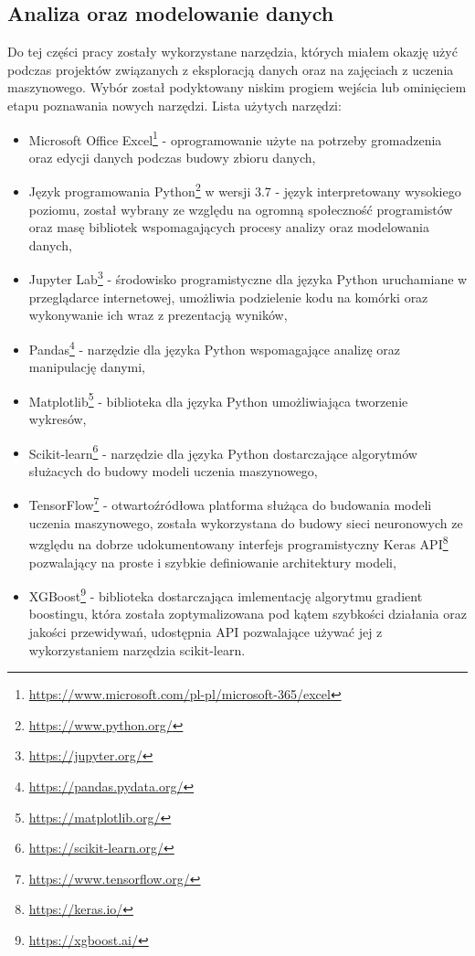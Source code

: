\subsection{Analiza oraz modelowanie danych}\label{sec:tools-data-analysis-modeling}
Do tej części pracy zostały wykorzystane narzędzia, których miałem okazję użyć podczas projektów związanych z eksploracją danych oraz na zajęciach z uczenia maszynowego. Wybór został podyktowany niskim progiem wejścia lub ominięciem etapu poznawania nowych narzędzi.
\newpage
Lista użytych narzędzi:
\begin{itemize}
    \item Microsoft Office Excel\footnote{\url{https://www.microsoft.com/pl-pl/microsoft-365/excel}} - oprogramowanie użyte na potrzeby gromadzenia oraz edycji danych podczas budowy zbioru danych,
    \item Język programowania Python\footnote{\url{https://www.python.org/}} w wersji 3.7 - język interpretowany wysokiego poziomu, został wybrany ze względu na ogromną społeczność programistów oraz masę bibliotek wspomagających procesy analizy oraz modelowania danych,
    \item Jupyter Lab\footnote{\url{https://jupyter.org/}} - środowisko programistyczne dla języka Python uruchamiane w przeglądarce internetowej, umożliwia podzielenie kodu na komórki oraz wykonywanie ich wraz z prezentacją wyników,
    \item Pandas\footnote{\url{https://pandas.pydata.org/}} - narzędzie dla języka Python wspomagające analizę oraz manipulację danymi,
    \item Matplotlib\footnote{\url{https://matplotlib.org/}} - biblioteka dla języka Python umożliwiająca tworzenie wykresów,
    \item Scikit-learn\footnote{\url{https://scikit-learn.org/}} \cite{scikit-learn} - narzędzie dla języka Python dostarczające algorytmów służacych do budowy modeli uczenia maszynowego,
    \item TensorFlow\footnote{\url{https://www.tensorflow.org/}} \cite{tensorflow2015-whitepaper} - otwartoźródłowa platforma służąca do budowania modeli uczenia maszynowego, została wykorzystana do budowy sieci neuronowych ze względu na dobrze udokumentowany interfejs programistyczny Keras API\footnote{\url{https://keras.io/}} pozwalający na proste i szybkie definiowanie architektury modeli,
    \item XGBoost\footnote{\url{https://xgboost.ai/}} \cite{xgboost} -  biblioteka dostarczająca imlementację algorytmu gradient boostingu, która została zoptymalizowana pod kątem szybkości działania oraz jakości przewidywań, udostępnia API pozwalające używać jej z wykorzystaniem narzędzia scikit-learn.
\end{itemize}

